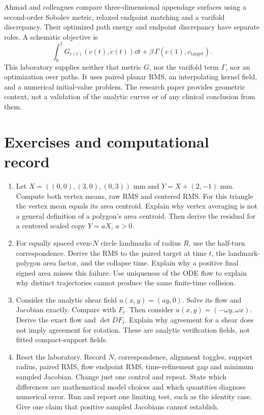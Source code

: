 \documentclass[11pt]{article}
\begin{document}
Ahmad and colleagues \cite{ahmad} compare three-dimensional appendage surfaces using a second-order Sobolev metric, relaxed endpoint matching and a varifold discrepancy. Their optimized path energy and endpoint discrepancy have separate roles. A schematic objective is
\[
 \int_0^1G_{c(t)}(\dot c(t),\dot c(t))\dd t
 +\beta\,\Gamma(c(1),c_{\mathrm{target}}).
\]
This laboratory supplies neither that metric $G$, nor the varifold term $\Gamma$, nor an optimization over paths. It uses paired planar RMS, an interpolating kernel field, and a numerical initial-value problem. The research paper provides geometric context, not a validation of the analytic curves or of any clinical conclusion from them.

\section{Exercises and computational record}\label{sec:practice}
\begin{enumerate}
\item Let $X=((0,0),(3,0),(0,3))$ mm and $Y=X+(2,-1)$ mm. Compute both vertex means, raw RMS and centered RMS. For this triangle the vertex mean equals its area centroid. Explain why vertex averaging is not a general definition of a polygon's area centroid. Then derive the residual for a centered scaled copy $Y=aX$, $a>0$.
\item For equally spaced even-$N$ circle landmarks of radius $R$, use the half-turn correspondence. Derive the RMS to the paired target at time $t$, the landmark-polygon area factor, and the collapse time. Explain why a positive final signed area misses this failure. Use uniqueness of the ODE flow to explain why distinct trajectories cannot produce the same finite-time collision.
\item Consider the analytic shear field $u(x,y)=(ay,0)$. Solve its flow and Jacobian exactly. Compare with $F_t$. Then consider $u(x,y)=(-\omega y,\omega x)$. Derive the exact flow and $\det DF_t$. Explain why agreement for a shear does not imply agreement for rotation. These are analytic verification fields, not fitted compact-support fields.
\item Reset the laboratory. Record $N$, correspondence, alignment toggles, support radius, paired RMS, flow endpoint RMS, time-refinement gap and minimum sampled Jacobian. Change just one control and repeat. State which differences are mathematical model choices and which quantities diagnose numerical error. Run and report one limiting test, such as the identity case. Give one claim that positive sampled Jacobians cannot establish.
\end{enumerate}
\end{document}
